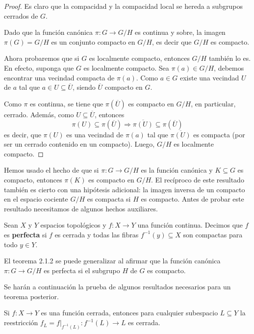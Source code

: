 \documentclass[12pt]{report}
\theoremstyle{largebreak}
\newcommand\cf[3]{\ensuremath{#1:#2\rightarrow#3}}
\newcommand{\Cls}[1]{\ensuremath{\overline{#1}}}
\begin{document}
    \begin{proof}
        Es claro que la compacidad y la compacidad local se hereda a subgrupos cerrados de $G$.

        Dado que la función canónica $\cf{\pi}{G}{G/H}$ es continua y sobre, la imagen $\pi(G)=G/H$ es un conjunto compacto en $G/H$, es decir que $G/H$ es compacto.

        Ahora probaremos que si $G$ es localmente compacto, entonces $G/H$ también lo es. En efecto, suponga que $G$ es localmente compacto. Sea $\pi(a)\in G/H$, debemos encontrar una vecindad compacta de $\pi(a)$. Como $a\in G$ existe una vecindad $U$ de $a$ tal que $a\in U\subseteq\Cls{U}$, siendo $\Cls{U}$ compacto en $G$.

        Como $\pi$ es continua, se tiene que $\pi(\Cls{U})$ es compacto en $G/H$, en particular, cerrado. Además, como $U\subseteq\Cls{U}$, entonces
        \begin{equation*}
            \pi(U)\subseteq\pi(\Cls{U})\Rightarrow\Cls{\pi(U)}\subseteq\pi(\Cls{U})
        \end{equation*}
        es decir, que $\pi(U)$ es una vecindad de $\pi(a)$ tal que $\Cls{\pi(U)}$ es compacta (por ser un cerrado contenido en un compacto). Luego, $G/H$ es localmente compacto.
    \end{proof}

    Hemos usado el hecho de que si $\cf{\pi}{G}{G/H}$ es la función canónica y $K\subseteq G$ es compacto, entonces $\pi(K)$ es compacto en $G/H$. El recíproco de este resultado también es cierto con una hipótesis adicional: la imagen inversa de un compacto en el espacio cociente $G/H$ es compacta si $H$ es compacto. Antes de probar este resultado necesitamos de algunos hechos auxiliares.

    \begin{mydef}
        Sean $X$ y $Y$ espacios topológicos y $\cf{f}{X}{Y}$ una función continua. Decimos que $f$ es \textbf{perfecta} si $f$ es cerrada y todas las fibras $f^{-1}(y)\subseteq X$ son compactas para todo $y\in Y$.
    \end{mydef}

    El teorema 2.1.2 se puede generalizar al afirmar que la función canónica $\cf{\pi}{G}{G/H}$ es perfecta si el subgrupo $H$ de $G$ es compacto.

    Se harán a continuación la prueba de algunos resultados necesarios para un teorema posterior.

    \begin{propo}
        Si $\cf{f}{X}{Y}$ es una función cerrada, entonces para cualquier subespacio $L\subseteq Y$ la reestricción $\cf{f_L=f\big|_{ f^{-1}(L)}}{f^{-1}(L)}{L}$ es cerrada.
    \end{propo}
\end{document}
